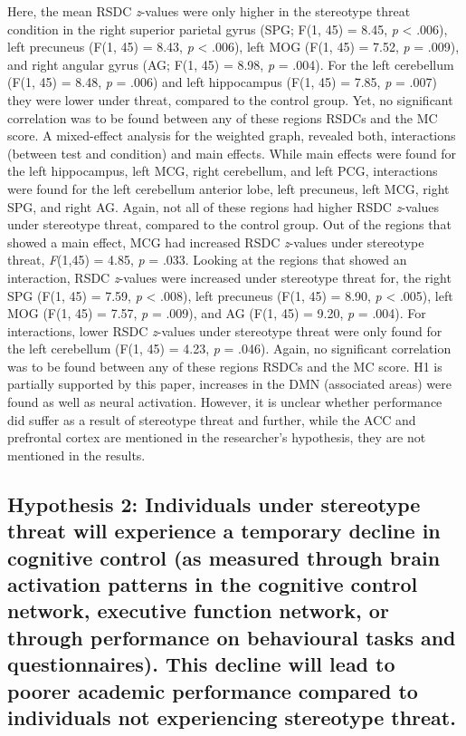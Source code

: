 \documentclass[
  stu,floatsintext]{apa7}
\begin{document}
Here, the mean RSDC \emph{z}-values were only higher in the stereotype threat condition in the right superior parietal gyrus (SPG; F(1, 45) = 8.45, \emph{p} \textless{} .006), left precuneus (F(1, 45) = 8.43, \emph{p} \textless{} .006), left MOG (F(1, 45) = 7.52, \emph{p} = .009), and right angular gyrus (AG; F(1, 45) = 8.98, \emph{p} = .004).
For the left cerebellum (F(1, 45) = 8.48, \emph{p} = .006) and left hippocampus (F(1, 45) = 7.85, \emph{p} = .007) they were lower under threat, compared to the control group.
Yet, no significant correlation was to be found between any of these regions RSDCs and the MC score.
A mixed-effect analysis for the weighted graph, revealed both, interactions (between test and condition) and main effects.
While main effects were found for the left hippocampus, left MCG, right cerebellum, and left PCG, interactions were found for the left cerebellum anterior lobe, left precuneus, left MCG, right SPG, and right AG.
Again, not all of these regions had higher RSDC \emph{z}-values under stereotype threat, compared to the control group.
Out of the regions that showed a main effect, MCG had increased RSDC \emph{z}-values under stereotype threat, \emph{F}(1,45) = 4.85, \emph{p} = .033.
Looking at the regions that showed an interaction, RSDC \emph{z}-values were increased under stereotype threat for, the right SPG (F(1, 45) = 7.59, \emph{p} \textless{} .008), left precuneus (F(1, 45) = 8.90, \emph{p} \textless{} .005), left MOG (F(1, 45) = 7.57, \emph{p} = .009), and AG (F(1, 45) = 9.20, \emph{p} = .004).
For interactions, lower RSDC \emph{z}-values under stereotype threat were only found for the left cerebellum (F(1, 45) = 4.23, \emph{p} = .046).
Again, no significant correlation was to be found between any of these regions RSDCs and the MC score.
H1 is partially supported by this paper, increases in the DMN (associated areas) were found as well as neural activation. However, it is unclear whether performance did suffer as a result of stereotype threat and further, while the ACC and prefrontal cortex are mentioned in the researcher's hypothesis, they are not mentioned in the results.

\subsection{Hypothesis 2: Individuals under stereotype threat will experience a temporary decline in cognitive control (as measured through brain activation patterns in the cognitive control network, executive function network, or through performance on behavioural tasks and questionnaires). This decline will lead to poorer academic performance compared to individuals not experiencing stereotype threat.}\label{hypothesis-2-individuals-under-stereotype-threat-will-experience-a-temporary-decline-in-cognitive-control-as-measured-through-brain-activation-patterns-in-the-cognitive-control-network-executive-function-network-or-through-performance-on-behavioural-tasks-and-questionnaires.-this-decline-will-lead-to-poorer-academic-performance-compared-to-individuals-not-experiencing-stereotype-threat.}
\end{document}
